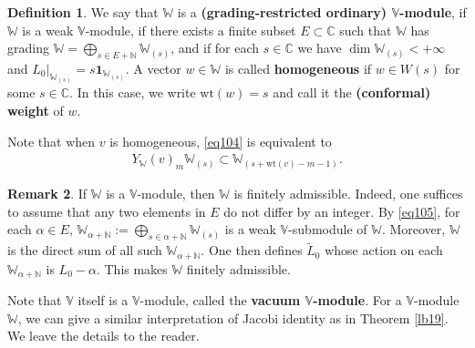 \documentclass[12pt,a4paper,notitlepage]{report}
\theoremstyle{definition}
\newtheorem{df}{Definition}[section]
\newtheorem{rem}[df]{Remark}
\theoremstyle{plain}
\newcommand{\wtd}{\widetilde}
\newcommand{\id}{\mathbf{1}}
\newcommand{\mbb}{\mathbb}
\newcommand{\Vbb}{\mathbb V}
\newcommand{\Wbb}{\mathbb W}
\newcommand{\Cbb}{\mathbb C}
\newcommand{\Nbb}{\mathbb N}
\newcommand{\wt}{\mathrm{wt}}
\numberwithin{equation}{section}
\begin{document}
\begin{df}
We say that $\Wbb$ is a \textbf{(grading-restricted ordinary) $\Vbb$-module}, if $\Wbb$ is a weak $\Vbb$-module, if there exists a finite subset $E\subset\Cbb$ such that  $\Wbb$ has grading $\Wbb=\bigoplus_{s\in E+\Nbb}\Wbb_{(s)}$,  and if for each $s\in\mbb C$ we have $\dim \Wbb_{(s)}<+\infty$ and $L_0|_{\Wbb_{(s)}}=s\id_{\Wbb_{(s)}}$. \index{Wn@$\Wbb(n),\Wbb_{(n)}$}  A vector $w\in\Wbb$ is called \textbf{homogeneous} if $w\in W(s)$ for some $s\in \mbb C$. In this case, we write $\wt(w)=s$ \index{wt@$\wt(v),\wt(w),\wtd\wt(w)$} and call it the \textbf{(conformal) weight} of $w$. 
\end{df}
Note that when $v$ is homogeneous, \eqref{eq104} is equivalent to
\begin{align}
Y_\Wbb(v)_m\Wbb_{(s)}\subset \Wbb_{(s+\wt(v)-m-1)}.\label{eq105}
\end{align}

\begin{rem}\label{lb137}
If $\Wbb$ is a $\Vbb$-module, then $\Wbb$ is finitely admissible. Indeed, one suffices to assume that any two elements in $E$ do not differ by an integer.   By \eqref{eq105}, for each $\alpha\in E$, $\Wbb_{\alpha+\Nbb}:=\bigoplus_{s\in\alpha+\Nbb}\Wbb_{(s)}$ is a weak $\Vbb$-submodule of $\Wbb$. Moreover, $\Wbb$ is the direct sum of all such $\Wbb_{\alpha+\Nbb}$. One then defines $\wtd L_0$ whose action on each $\Wbb_{\alpha+\Nbb}$ is $L_0-\alpha$. This makes $\Wbb$ finitely admissible. 
\end{rem}





Note that $\Vbb$ itself is a $\Vbb$-module, called the \textbf{vacuum $\Vbb$-module}. For a $\Vbb$-module $\Wbb$, we can give a similar interpretation of Jacobi identity as in Theorem \ref{lb19}. We leave the details to the reader. 
\end{document}
